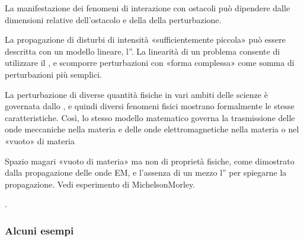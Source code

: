 \documentclass[letterpaper,10pt,italian]{jupyterBook}
\begin{document}
\sphinxAtStartPar
La manifestazione dei fenomeni di interazione con ostacoli può dipendere dalle dimensioni relative dell’ostacolo e della  della perturbazione.

\sphinxAtStartPar
La propagazione di disturbi di intensità «sufficientemente piccola» può essere descritta con un modello lineare, l”. La linearità di un problema consente di utilizzare il , e scomporre perturbazioni con «forma complessa» come somma di perturbazioni più semplici.

\sphinxAtStartPar
La perturbazione di diverse quantità fisiche in vari ambiti delle scienze è governata dallo , e quindi diversi fenomeni fisici mostrano formalmente le stesse caratteristiche. Così, lo stesso modello matematico governa la trasmissione delle onde meccaniche nella materia e delle onde elettromagnetiche nella materia o nel «vuoto» \sphinxhyphen{} di materia%
\begin{footnote}[2]\sphinxAtStartFootnote
Spazio magari «vuoto di materia» ma non di proprietà fisiche, come dimostrato dalla propagazione delle onde EM, e l’assenza di un mezzo \sphinxhyphen{} l” \sphinxhyphen{} per spiegarne la propagazione. Vedi esperimento di Michelson\sphinxhyphen{}Morley.
%
\end{footnote}.
\subsubsection*{Alcuni esempi}
\end{document}
